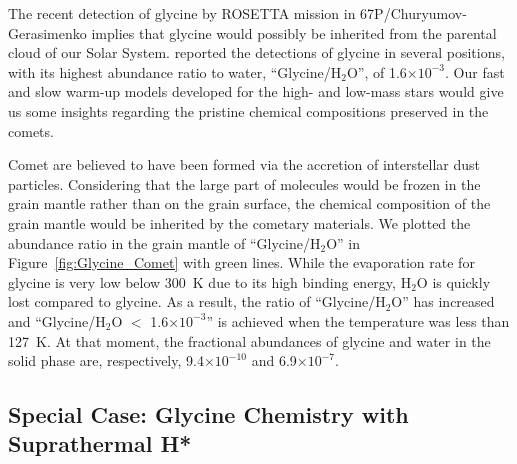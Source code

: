 \documentclass{aastex61}
\begin{document}
The recent detection of glycine by ROSETTA mission in 67P/Churyumov-Gerasimenko \citep{Altwegg16} implies that glycine would possibly be inherited from the parental cloud of our Solar System. 
%
\cite{Altwegg16} reported the detections of glycine in several positions, with its highest abundance ratio to water, ``Glycine/H$_2$O'', of 1.6$\times10^{-3}$.
%
Our fast and slow warm-up models developed for the high- and low-mass stars would give us some insights regarding the pristine chemical compositions preserved in the comets.


Comet are believed to have been formed via the accretion of interstellar dust particles.
%
Considering that the large part of molecules would be frozen in the grain mantle rather than on the grain surface, the chemical composition of the grain mantle would be inherited by the cometary materials.
%
We plotted the abundance ratio in the grain mantle of ``Glycine/H$_2$O'' in Figure~\ref{fig:Glycine_Comet} with green lines.
%
While the evaporation rate for glycine is very low below 300~K due to its high binding energy, H$_2$O is quickly lost compared to glycine.
%
As a result, the ratio of ``Glycine/H$_2$O'' has increased and ``Glycine/H$_2$O $<$ 1.6$\times10^{-3}$'' is achieved when the temperature was less than 127~K.
%
At that moment, the fractional abundances of glycine and water in the solid phase are, respectively, 9.4$\times10^{-10}$ and 6.9$\times10^{-7}$.

%







\subsection{Special Case: Glycine Chemistry with Suprathermal H*}
\end{document}
